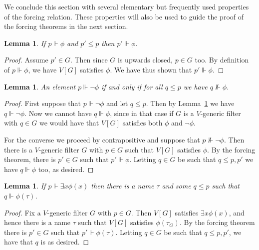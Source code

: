 \documentclass[11pt,oneside,a4paper]{amsbook}
\newcommand{\forces}{\Vdash}
\theoremstyle{definition}
\theoremstyle{plain}
\newtheorem{lemma}[theorem]{Lemma}
\theoremstyle{definition}
\theoremstyle{remark}
\numberwithin{equation}{section}
\numberwithin{figure}{section}
\begin{document}
We conclude this section with several elementary but frequently used properties of the forcing relation. These properties will also be used to guide the proof of the forcing theorems in the next section.

\begin{lemma}
  \label{lem:forcing-downward}
  If $p\forces\phi$ and $p'\leq p$ then $p'\forces\phi$.
\end{lemma}

\begin{proof}
  Assume $p'\in G$. Then since $G$ is upwards closed, $p\in G$ too. By definition of $p\forces\phi$, we have $V[G]$ satisfies $\phi$. We have thus shown that $p'\forces\phi$.
\end{proof}

\begin{lemma}
  An element $p\forces\neg\phi$ if and only if for all $q\leq p$ we have $q\not\forces\phi$.
\end{lemma}

\begin{proof}
  First suppose that $p\forces\neg\phi$ and let $q\leq p$. Then by Lemma~\ref{lem:forcing-downward} we have $q\forces\neg\phi$. Now we cannot have $q\forces\phi$, since in that case if $G$ is a $V$-generic filter with $q\in G$ we would have that $V[G]$ satisfies both $\phi$ and $\neg\phi$.

  For the converse we proceed by contrapositive and suppose that $p\not\forces\neg\phi$. Then there is a $V$-generic filter $G$ with $p\in G$ such that $V[G]$ satisfies $\phi$. By the forcing theorem, there is $p'\in G$ such that $p'\forces\phi$. Letting $q\in G$ be such that $q\leq p,p'$ we have $q\forces\phi$ too, as desired.
\end{proof}

\begin{lemma}
  \label{lem:forcing-exists}
  If $p\forces\exists x\phi(x)$ then there is a name $\tau$ and some $q\leq p$ such that $q\forces\phi(\tau)$.
\end{lemma}

\begin{proof}
  Fix a $V$-generic filter $G$ with $p\in G$. Then $V[G]$ satisfies $\exists x\phi(x)$, and hence there is a name $\tau$ such that $V[G]$ satisfies $\phi(\tau_G)$. By the forcing theorem there is $p'\in G$ such that $p'\forces\phi(\tau)$. Letting $q\in G$ be such that $q\leq p,p'$, we have that $q$ is as desired.
\end{proof}
\end{document}
